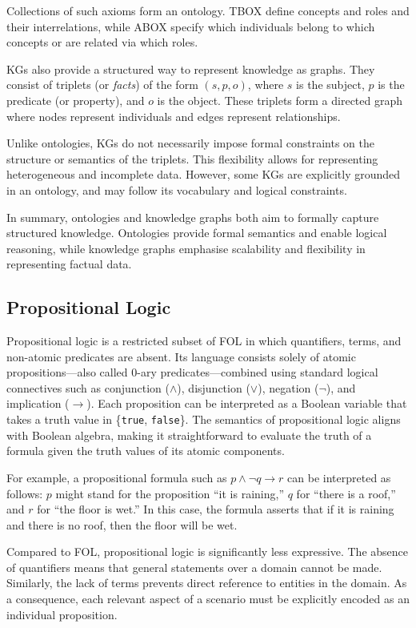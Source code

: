 Collections of such axioms form an ontology.
%
\Gls{TBOX} define concepts and roles and their interrelations, while \gls{ABOX} specify which individuals belong to which concepts or are related via which roles.

\Glspl{KG} also provide a structured way to represent knowledge as graphs.
%
They consist of triplets (or \emph{facts}) of the form $(s, p, o)$, where $s$ is the subject, $p$ is the predicate (or property), and $o$ is the object.
%
These triplets form a directed graph where nodes represent individuals and edges represent relationships.

Unlike ontologies, KGs do not necessarily impose formal constraints on the structure or semantics of the triplets.
%
This flexibility allows for representing heterogeneous and incomplete data.
%
However, some \glspl{KG} are explicitly grounded in an ontology, and may follow its vocabulary and logical constraints.

In summary, ontologies and knowledge graphs both aim to formally capture structured knowledge.
%
Ontologies provide formal semantics and enable logical reasoning, while knowledge graphs emphasise scalability and flexibility in representing factual data.


\subsection{Propositional Logic}\label{subsubsec:propositional-logic}
%
Propositional logic is a restricted subset of \gls{FOL} in which quantifiers, terms, and non-atomic predicates are absent.  
%
Its language consists solely of atomic propositions—also called 0-ary predicates—combined using standard logical connectives such as conjunction ($\land$), disjunction ($\lor$), negation ($\lnot$), and implication ($\rightarrow$).  
%
Each proposition can be interpreted as a Boolean variable that takes a truth value in \{\texttt{true}, \texttt{false}\}.  
%
The semantics of propositional logic aligns with Boolean algebra, making it straightforward to evaluate the truth of a formula given the truth values of its atomic components.

For example, a propositional formula such as $p \land \lnot q \rightarrow r$ can be interpreted as follows:  
%
$p$ might stand for the proposition ``it is raining,'' $q$ for ``there is a roof,'' and $r$ for ``the floor is wet.''  
%
In this case, the formula asserts that if it is raining and there is no roof, then the floor will be wet.

Compared to \gls{FOL}, propositional logic is significantly less expressive.  
%
The absence of quantifiers means that general statements over a domain cannot be made.  
%
Similarly, the lack of terms prevents direct reference to entities in the domain.  
%
As a consequence, each relevant aspect of a scenario must be explicitly encoded as an individual proposition.

